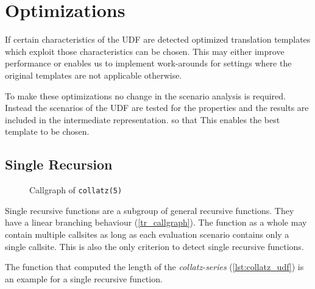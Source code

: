 \chapter{Optimizations}\label{chapter:optimizations}

If certain characteristics of the UDF are detected optimized translation templates which exploit those characteristics can be chosen. This may either improve performance or enables us to implement work-arounds for settings where the original templates are not applicable otherwise.

To make these optimizations no change in the scenario analysis is required. Instead the scenarios of the UDF are tested for the properties and the results are included in the intermediate representation. so that This enables the best template to be chosen.

\section{Single Recursion}

\begin{wrapfigure}{r}{0.2\textwidth}
  \vspace{-10pt}
  \centering
{}
  \vspace{-10pt}
  \caption{Callgraph of \texttt{collatz(5)}}
  \label{tr_callgraph}
\end{wrapfigure}

Single recursive functions are a subgroup of general recursive functions. They have a linear branching behaviour (\autoref{tr_callgraph}). The function as a whole may contain multiple callsites as long as each evaluation scenario contains only a single callsite. This is also the only criterion to detect single recursive functions.

The function that computed the length of the \textit{collatz-series} (\autoref{lst:collatz_udf}) is an example for a single recursive function.

